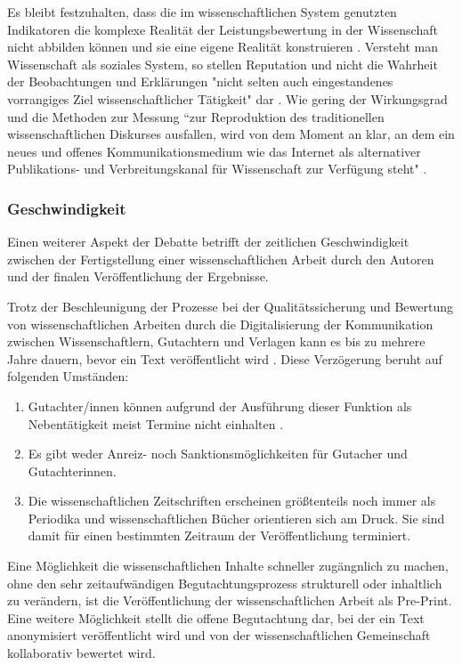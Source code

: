 Es bleibt festzuhalten, dass die im wissenschaftlichen System genutzten Indikatoren die komplexe Realität der Leistungsbewertung in der Wissenschaft nicht abbilden können und sie eine eigene Realität konstruieren \cite{Hornbostel_1997}. Versteht man Wissenschaft als soziales System, so stellen Reputation und nicht die Wahrheit der Beobachtungen und Erklärungen "nicht selten auch eingestandenes vorrangiges Ziel wissenschaftlicher Tätigkeit" dar \cite{luhmann_1970_selbststeuerung}. Wie gering der Wirkungsgrad und die Methoden zur Messung “zur Reproduktion des traditionellen wissenschaftlichen Diskurses ausfallen, wird von dem Moment an klar, an dem ein neues und offenes Kommunikationsmedium wie das Internet als alternativer Publikations- und Verbreitungskanal für Wissenschaft zur Verfügung steht" \cite{Rost_1998}.

\subsubsection{Geschwindigkeit}

Einen weiterer Aspekt der Debatte betrifft der zeitlichen Geschwindigkeit zwischen der Fertigstellung einer wissenschaftlichen Arbeit durch den Autoren und der finalen Veröffentlichung der Ergebnisse.

Trotz der Beschleunigung der Prozesse bei der Qualitätssicherung und Bewertung von wissenschaftlichen Arbeiten durch die Digitalisierung der Kommunikation zwischen Wissenschaftlern, Gutachtern und Verlagen kann es bis zu mehrere Jahre dauern, bevor ein Text veröffentlicht wird \cite{suchen}. Diese Verzögerung beruht auf folgenden Umständen:

\begin{enumerate}
\item Gutachter/innen können aufgrund der Ausführung dieser Funktion als Nebentätigkeit meist Termine nicht einhalten \cite{suchen}.
\item Es gibt weder Anreiz- noch Sanktionsmöglichkeiten für Gutacher und Gutachterinnen.
\item Die wissenschaftlichen Zeitschriften erscheinen größtenteils noch immer als Periodika und wissenschaftlichen Bücher orientieren sich am Druck. Sie sind damit für einen bestimmten Zeitraum der Veröffentlichung terminiert.
\end{enumerate}

Eine Möglichkeit die wissenschaftlichen Inhalte schneller zugängnlich zu machen, ohne den sehr zeitaufwändigen Begutachtungsprozess strukturell oder inhaltlich zu verändern, ist die Veröffentlichung der wissenschaftlichen Arbeit als Pre-Print. Eine weitere Möglichkeit stellt die offene Begutachtung dar, bei der ein Text anonymisiert veröffentlicht wird und von der wissenschaftlichen Gemeinschaft kollaborativ bewertet wird.

